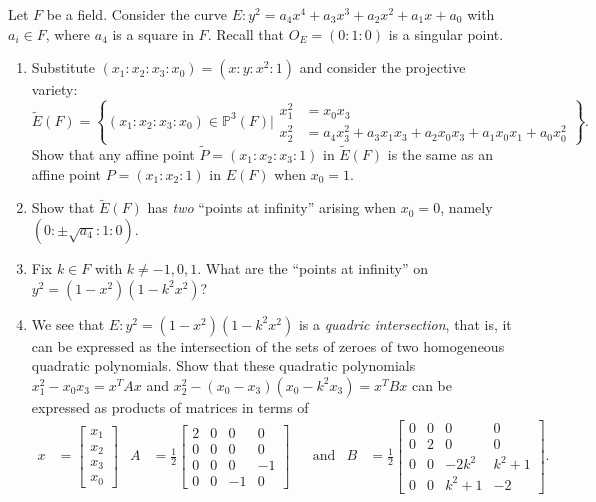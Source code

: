 \documentclass[12 pt, letterpaper]{hmcpset}
\begin{document}
\pagebreak

\begin{problem}[Problem 3.]
	Let $F$ be a field. Consider the curve $E : y^{2} = a_{4} x^{4} + a_{3} x^{3} + a_{2} x^{2} + a_{1} x + a_{0}$ with $a_{i} \in F$, where $a_{4}$ is a square in $F$. Recall that $O_{E} = (0 : 1 : 0)$ is a singular point.
	\begin{enumerate}
		\item Substitute $(x_{1} : x_{2} : x_{3} : x_{0}) = (x : y : x^{2} : 1)$ and consider the projective variety:
			\[
				\tilde{E}(F) = \left \{ (x_{1} : x_{2} : x_{3} : x_{0}) \in \mathbb{P}^{3}(F) \Big | \begin{split}
						x_{1}^{2} & = x_{0} x_{3} \\
						x_{2}^{2} & = a_{4} x_{3}^{2} + a_{3} x_{1} x_{3} + a_{2} x_{0} x_{3} + a_{1} x_{0} x_{1} + a_{0} x_{0}^{2}
				\end{split} \right \}.
			\]
			Show that any affine point $\tilde{P} = (x_{1} : x_{2} : x_{3} : 1)$  in $\tilde{E}(F)$ is the same as an affine point $P = (x_{1} : x_{2} : 1)$ in $E(F)$ when $x_{0} = 1$.
		\item Show that $\tilde{E}(F)$ has \emph{two} ``points at infinity'' arising when $x_{0} = 0$, namely $(0 : \pm \sqrt{a_{4}} : 1 : 0)$.
		\item Fix $k \in F$ with $k \neq -1, 0, 1$. What are the ``points at infinity'' on $y^{2} = (1 - x^{2})(1 - k^{2} x^{2})$?
		\item We see that $E : y^{2} = (1 - x^{2})(1 - k^{2} x^{2})$ is a \emph{quadric intersection}, that is, it can be expressed as the intersection of the sets of zeroes of two homogeneous quadratic polynomials. Show that these quadratic polynomials $x_{1}^{2} - x_{0} x_{3} = x^{T} A x$ and $x_{2}^{2} - (x_{0} - x_{3})(x_{0} - k^{2} x_{3}) = x^{T} B x$ can be expressed as products of matrices in terms of
			\begin{align*}
				x & = \begin{bmatrix}
					x_{1} \\
					x_{2} \\
					x_{3} \\
					x_{0}
				\end{bmatrix} & A & = \frac{1}{2} \begin{bmatrix}
				2 & 0 & 0 & 0 \\
				0 & 0 & 0 & 0 \\
				0 & 0 & 0 & -1 \\
				0 & 0 & -1 & 0
				\end{bmatrix} & & \text{and} & B & = \frac{1}{2} \begin{bmatrix}
			0 & 0 & 0 & 0 \\
			0 & 2 & 0 & 0 \\
			0 & 0 & -2k^{2} & k^{2} + 1 \\
			0 & 0 & k^{2} + 1 & -2
			\end{bmatrix}.
			\end{align*}
	\end{enumerate}
\end{problem}
\end{document}
